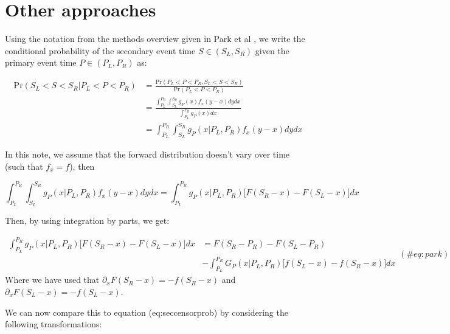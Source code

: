 \documentclass[10pt,letterpaper]{article}
\begin{document}




\appendix \section{Other approaches} 


Using the notation from the methods overview given in Park et al \cite{Park2024.01.12.24301247}, we write the conditional probability of the secondary event time $S\in (S_L,S_R)$ given the primary event time $P \in (P_L,P_R)$ as:

\begin{equation}
\begin{aligned}
\mathrm{Pr}(S_L < S < S_R | P_L < P < P_R) &= \frac{\mathrm{Pr}(P_L < P < P_R, S_L < S < S_R)}{\mathrm{Pr}(P_L < P < P_R)} \\
   &= \frac{\int_{P_L}^{P_R} \int_{S_L}^{S_R} g_P(x) f_x(y-x) dy dx}{\int_{P_L}^{P_R} g_P(x) dx}\\
   &= \int_{P_L}^{P_R} \int_{S_L}^{S_R} g_P(x|P_L, P_R) f_x(y-x)dy dx
\end{aligned}
\end{equation}

In this note, we assume that the forward distribution doesn't vary over time (such that $f_x = f$), then

\begin{equation}
\int_{P_L}^{P_R} \int_{S_L}^{S_R} g_P(x|P_L, P_R) f_x(y-x)dy dx = \int_{P_L}^{P_R} g_P(x|P_L, P_R) \big[F(S_R - x) - F(S_L - x)\big] dx
\end{equation}

Then, by using integration by parts, we get:

\begin{equation}
\begin{split}
\int_{P_L}^{P_R} g_P(x|P_L, P_R) \big[F(S_R - x) - F(S_L - x)\big] dx &=
F(S_R - P_R) - F(S_L - P_R)  \\ & - \int_{P_L}^{P_R} G_P(x|P_L, P_R) \big[f(S_L - x) - f(S_R - x)\big] dx
\end{split} (\#eq:park)
\end{equation}
Where we have used that $\partial_x F(S_R - x) = - f(S_R - x)$ and $\partial_x F(S_L - x) = - f(S_L - x)$.

We can now compare this to equation \@ref(eq:seccensorprob) by considering the following transformations:
\end{document}
